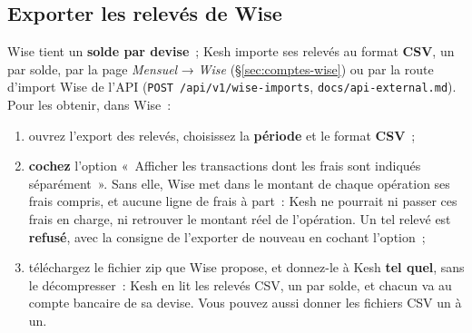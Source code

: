 \documentclass[a4paper,11pt,oneside]{article}
\begin{document}
\subsection{Exporter les relevés de Wise}\label{sec:wise-export}

Wise tient un \textbf{solde par devise}~; Kesh importe ses relevés au format \textbf{CSV}, un par solde, par la page \emph{Mensuel} → \emph{Wise} (\S\ref{sec:comptes-wise}) ou par la route d'import Wise de l'API (\texttt{POST /api/v1/wise-imports}, \texttt{docs/api-external.md}). Pour les obtenir, dans Wise~:

\begin{enumerate}
    \item ouvrez l'export des relevés, choisissez la \textbf{période} et le format \textbf{CSV}~;
    \item \textbf{cochez} l'option «~Afficher les transactions dont les frais sont indiqués séparément~». Sans elle, Wise met dans le montant de chaque opération ses frais compris, et aucune ligne de frais à part~: Kesh ne pourrait ni passer ces frais en charge, ni retrouver le montant réel de l'opération. Un tel relevé est \textbf{refusé}, avec la consigne de l'exporter de nouveau en cochant l'option~;
    \item téléchargez le fichier zip que Wise propose, et donnez-le à Kesh \textbf{tel quel}, sans le décompresser~: Kesh en lit les relevés CSV, un par solde, et chacun va au compte bancaire de sa devise. Vous pouvez aussi donner les fichiers CSV un à un.
\end{enumerate}
\end{document}
